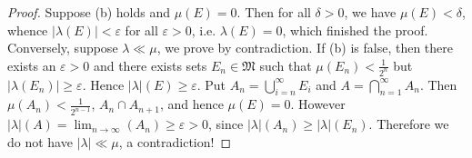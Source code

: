 \begin{proof}
Suppose (b) holds and $\mu(E)=0$. Then for all $\delta>0$, we have $\mu(E)<\delta$, whence $|\lambda(E)|<\varepsilon$ for all $\varepsilon>0$, i.e. $\lambda(E)=0$, which finished the proof. Conversely, suppose $\lambda\ll\mu$, we prove by contradiction. If (b) is false, then there exists an $\varepsilon>0$ and there exists sets $E_n\in\mathfrak{M}$ such that $\mu(E_n)<\frac{1}{2^n}$ but $|\lambda(E_n)|\ge\varepsilon$. Hence $|\lambda|(E)\ge\varepsilon$. Put $A_n=\bigcup_{i=n}^\infty E_i$ and $A=\bigcap_{n=1}^\infty A_n$. Then $\mu(A_n)<\frac{1}{2^{n-1}}$, $A_n\cap A_{n+1}$, and hence $\mu(E)=0$. However $|\lambda|(A)=\lim_{n\to\infty}(A_n)\ge\varepsilon>0$, since $|\lambda|(A_n)\ge|\lambda|(E_n)$. Therefore we do not have $|\lambda|\ll\mu$, a contradiction!
\end{proof}

